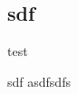 \subsection{sdf}
\begin{frame}{\insertsubsection} %
	\begin{fancycolumns}
		test
		
		\nextcolumn
		
		\begin{note}{sdf}
			asdfsdfs
		\end{note}
	\end{fancycolumns}
\end{frame}
